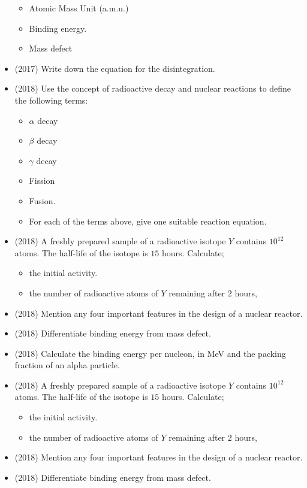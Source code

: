 \documentclass{article}
\begin{document}
\begin{itemize}
 \begin{itemize}
\item Atomic Mass Unit (a.m.u.)
\item Binding energy. 
\item Mass defect
\end{itemize}
\item (2017)  Write down the equation for the disintegration.
\item (2018)  Use the concept of radioactive decay and nuclear reactions to define the following terms:
 \begin{itemize}
\item $ \alpha $ decay
\item $ \beta$ decay
\item $ \gamma $ decay
\item Fission
\item Fusion.
\item For each of the terms above, give one suitable reaction equation. 
\end{itemize}
\item (2018)  A freshly prepared sample of a radioactive isotope $ Y$ contains $ 10^{12}$ atoms. The half-life of the isotope is $ 15$ hours. Calculate;
 \begin{itemize}
\item the initial activity. 
\item the number of radioactive atoms of $ Y$ remaining after $ 2$ hours, 
\end{itemize}
\item (2018)  Mention any four important features in the design of a nuclear reactor.
\item (2018)  Differentiate binding energy from mass defect.
\item (2018)  Calculate the binding energy per nucleon, in MeV and the packing fraction of an alpha particle.
\item (2018)  A freshly prepared sample of a radioactive isotope $ Y$ contains $ 10^{12}$ atoms. The half-life of the isotope is $ 15$ hours. Calculate;
 \begin{itemize}
\item the initial activity. 
\item the number of radioactive atoms of $ Y$ remaining after $ 2$ hours, 
\end{itemize}
\item (2018)  Mention any four important features in the design of a nuclear reactor.
\item (2018)  Differentiate binding energy from mass defect.

\end{itemize}
\end{document}
